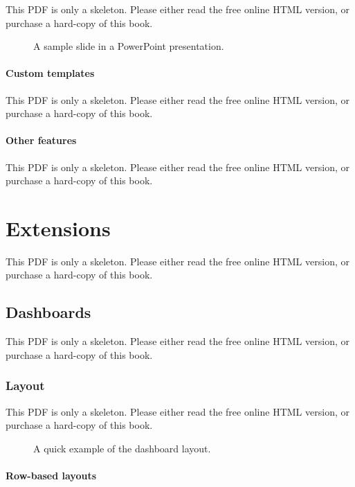 \documentclass[
  11pt,
]{krantz}
\theoremstyle{definition}
\theoremstyle{definition}
\theoremstyle{definition}
\theoremstyle{definition}
\theoremstyle{remark}
\begin{document}
This PDF is only a skeleton. Please either read the free online HTML version, or purchase a hard-copy of this book.

\begin{figure}\caption{A sample slide in a PowerPoint presentation.}\end{figure}

\subsection{Custom templates}\label{ppt-templates}

This PDF is only a skeleton. Please either read the free online HTML version, or purchase a hard-copy of this book.

\subsection{Other features}\label{other-features-8}

This PDF is only a skeleton. Please either read the free online HTML version, or purchase a hard-copy of this book.

\part{Extensions}\label{part-extensions}

This PDF is only a skeleton. Please either read the free online HTML version, or purchase a hard-copy of this book.

\chapter{Dashboards}\label{dashboards}

This PDF is only a skeleton. Please either read the free online HTML version, or purchase a hard-copy of this book.

\section{Layout}\label{layout}

This PDF is only a skeleton. Please either read the free online HTML version, or purchase a hard-copy of this book.

\begin{figure}\caption{A quick example of the dashboard layout.}\end{figure}

\subsection{Row-based layouts}\label{row-based-layouts}
\end{document}
